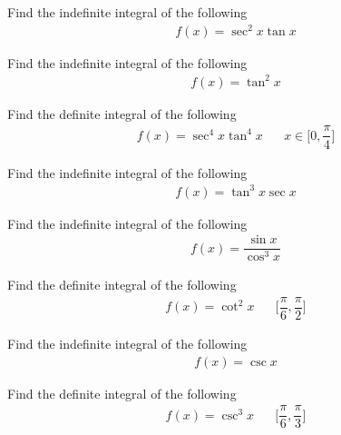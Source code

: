 \begin{exercise}
Find the indefinite integral of the following
\begin{align*}
    f(x) = \sec^{2} x \tan x
\end{align*}
\end{exercise}

\begin{exercise}
Find the indefinite integral of the following
\begin{align*}
    f(x) = \tan^{2} x 
\end{align*}
\end{exercise}

\begin{exercise}
Find the definite integral of the following
\begin{align*}
    f(x) = \sec^{4} x \tan^{4} x \hspace{20pt} x \in \Big[0, \dfrac{\pi}{4} \Big]
\end{align*}
\end{exercise}

\begin{exercise}
Find the indefinite integral of the following
\begin{align*}
    f(x) = \tan^{3} x \sec x
\end{align*}
\end{exercise}

\begin{exercise}
Find the indefinite integral of the following
\begin{align*}
    f(x) = \dfrac{\sin x}{\cos^{3} x}
\end{align*}
\end{exercise}

\begin{exercise}
Find the definite integral of the following
\begin{align*}
    f(x) = \cot^{2} x \hspace{20pt} \Big[\dfrac{\pi}{6}, \dfrac{\pi}{2}\Big]
\end{align*}
\end{exercise}

\begin{exercise}
Find the indefinite integral of the following
\begin{align*}
    f(x) = \csc x
\end{align*}
\end{exercise}

\begin{exercise}
Find the definite integral of the following
\begin{align*}
    f(x) = \csc^{3} x \hspace{20pt} \Big[\dfrac{\pi}{6}, \dfrac{\pi}{3}\Big]
\end{align*}
\end{exercise}

